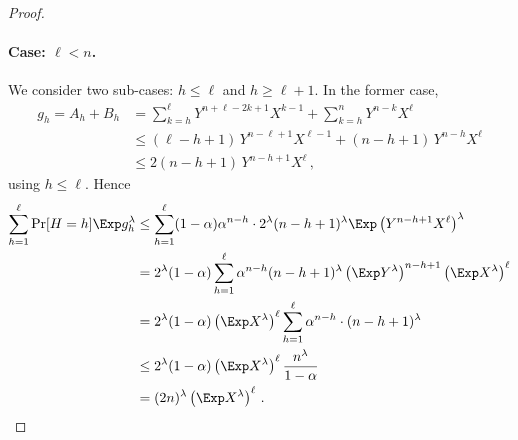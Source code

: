 \begin{proof}
\paragraph{Case: $\ell < n$.} 
We consider two sub-cases: $h \leq \ell$ and $h \geq \ell + 1$.
In the former case,
\begin{align*}
    g_h = A_h + B_h 
    &= \sum_{k=h}^\ell Y^{n+\ell - 2k + 1}X^{k-1} + \sum_{k=h}^n Y^{n-k} X^\ell    \\
    &\leq (\ell - h + 1)\, Y^{n-\ell+1} X^{\ell - 1} + (n-h+1)\, Y^{n-h} X^\ell \\
    &\leq 2 (n - h + 1)\, Y^{n-h + 1} X^\ell\,,
\end{align*}
using $h \leq \ell$. 
Hence
\begin{align*}
        \sum_{h = 1}^\ell \Pr[H = h] \Exp g_h^\lambda 
        &\leq \sum_{h=1}^\ell 
            (1-\alpha)\alpha^{n-h}\cdot 
            2^\lambda 
            (n-h+1)^\lambda 
            \Exp\left( Y^{n-h+1} X^\ell \right)^\lambda \\
        &= 2^\lambda (1-\alpha) \sum_{h=1}^\ell 
            \alpha^{n-h} 
            (n-h+1)^\lambda 
            \left(\Exp Y^\lambda \right)^{n-h+1} 
            \left(\Exp X^\lambda\right)^\ell \\
        &= 2^\lambda (1-\alpha) \left(\Exp X^\lambda\right)^\ell \sum_{h=1}^\ell \alpha^{n-h}\cdot (n-h+1)^\lambda \\
        &\leq 2^\lambda (1-\alpha) \left(\Exp X^\lambda\right)^\ell \frac{n^\lambda}{1-\alpha} \\
        &= (2n)^\lambda \left(\Exp X^\lambda\right)^\ell
        \,.
\end{align*}


\end{proof}
